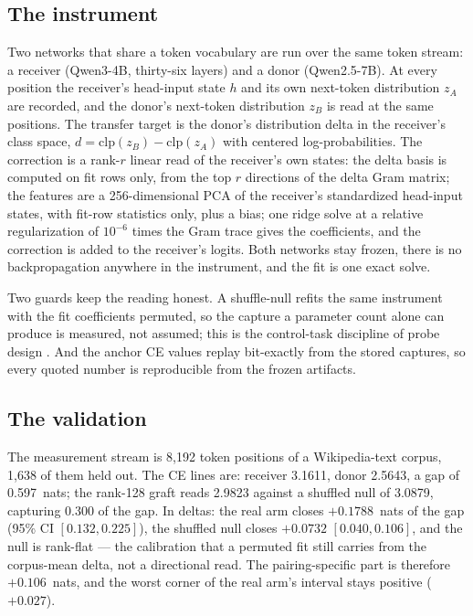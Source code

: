 \documentclass[11pt]{article}
\begin{document}
\subsection{The instrument}

Two networks that share a token vocabulary are run over the same
token stream: a receiver (Qwen3-4B, thirty-six layers) and a donor
(Qwen2.5-7B). At every position the receiver's head-input state
$h$ and its own next-token distribution $z_A$ are recorded, and
the donor's next-token distribution $z_B$ is read at the same
positions. The transfer target is the donor's distribution delta
in the receiver's class space, $d = \mathrm{clp}(z_B) -
\mathrm{clp}(z_A)$ with centered log-probabilities. The correction
is a rank-$r$ linear read of the receiver's own states: the delta
basis is computed on fit rows only, from the top $r$ directions of
the delta Gram matrix; the features are a 256-dimensional PCA of
the receiver's standardized head-input states, with fit-row
statistics only, plus a bias; one ridge solve at a relative
regularization of $10^{-6}$ times the Gram trace gives the
coefficients, and the correction is added to the receiver's
logits. Both networks stay frozen, there is no backpropagation
anywhere in the instrument, and the fit is one exact solve.

Two guards keep the reading honest. A shuffle-null refits the same
instrument with the fit coefficients permuted, so the capture a
parameter count alone can produce is measured, not assumed; this
is the control-task discipline of probe design
\cite{hewitt2019}. And the anchor CE values replay bit-exactly
from the stored captures, so every quoted number is reproducible
from the frozen artifacts.

\subsection{The validation}

The measurement stream is 8{,}192 token positions of a
Wikipedia-text corpus, 1{,}638 of them held out. The CE lines are:
receiver 3.1611, donor 2.5643, a gap of 0.597~nats; the rank-128
graft reads 2.9823 against a shuffled null of 3.0879, capturing
0.300 of the gap. In deltas: the real arm closes $+0.1788$~nats
of the gap (95\% CI $[0.132, 0.225]$), the shuffled null closes
$+0.0732$ $[0.040, 0.106]$, and the null is rank-flat --- the
calibration that a permuted fit still carries from the corpus-mean
delta, not a directional read. The pairing-specific part is
therefore $+0.106$~nats, and the worst corner of the real arm's
interval stays positive ($+0.027$).
\end{document}
